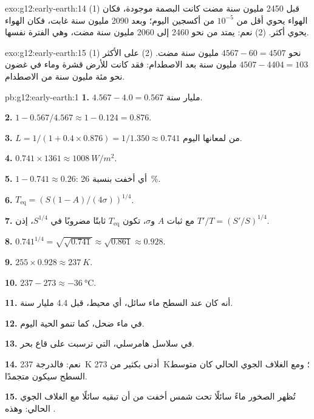 \begin{solution}{exo:g12:early-earth:14}
(1) قبل 2450 مليون سنة مضت كانت البصمة موجودة، فكان الهواء يحوي أقل
من $10^{-5}$ من أكسجين اليوم؛ وبعد 2090 مليون سنة غابت، فكان
الهواء يحوي أكثر. (2) نعم:  يمتد من نحو 2460 إلى
2060 مليون سنة مضت، وهي الفترة نفسها.
\end{solution}

\begin{solution}{exo:g12:early-earth:15}
(1) نحو $4567 - 60 = 4507$ مليون سنة مضت. (2) على الأكثر $4507 - 4404 =
103$ مليون سنة بعد الاصطدام: فقد كانت للأرض قشرة وماء في غضون
نحو مئة مليون سنة من الاصطدام.
\end{solution}

\begin{solution}{pb:g12:early-earth:1}
\textbf{1.} $4.567 - 4.0 = 0.567$ مليار سنة.

\textbf{2.} $1 - 0.567/4.567 \approx 1 - 0.124 = 0.876$.

\textbf{3.} $L = 1/(1 + 0.4 \times 0.876) = 1/1.350 \approx 0.741$ من
لمعانها اليوم.

\textbf{4.} $0.741 \times 1361 \approx \qty{1008}{W/m^2}$.

\textbf{5.} $1 - 0.741 \approx 0.26$: أي أخفت بنسبة \qty{26}{\percent}.

\textbf{6.} $T_{\mathrm{eq}} = \left(S(1-A)/(4\sigma)\right)^{1/4}$.

\textbf{7.} مع ثبات $A$ و$\sigma$، تكون $T_{\mathrm{eq}}$ ثابتًا مضروبًا في
$S^{1/4}$، إذن $T'/T = (S'/S)^{1/4}$.

\textbf{8.} $0.741^{1/4} = \sqrt{\sqrt{0.741}} \approx \sqrt{0.861} \approx
0.928$.

\textbf{9.} $255 \times 0.928 \approx \qty{237}{K}$.

\textbf{10.} $237 - 273 \approx \qty{-36}{\celsius}$.

\textbf{11.} أنه كان عند السطح ماء سائل، أي محيط، قبل 4.4
مليار سنة.

\textbf{12.} في ماء ضحل، كما تنمو  الحية اليوم.

\textbf{13.}  في سلاسل هامرسلي، التي ترسبت
على قاع بحر.

\textbf{14.} نعم: فالدرجة \qty{237}{K} أدنى بكثير من \qty{273}{K}؛ ومع الغلاف
الجوي الحالي كان متوسط السطح سيكون متجمدًا.

\textbf{15.} تُظهر الصخور ماءً سائلًا تحت شمس أخفت من أن تبقيه
سائلًا مع الغلاف الجوي الحالي: وهذه .


\end{solution}
